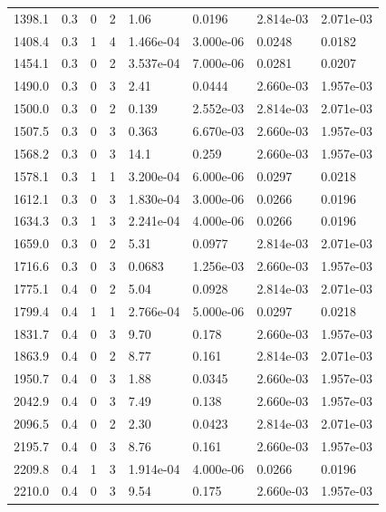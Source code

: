 \documentclass[preview]{standalone}
\begin{document}
{{{\begin{tabular}{L{1.2cm}C{1.2cm} C{0.3cm}C{0.5cm} C{1.4cm}C{1.4cm} C{1.4cm}C{1.4cm}}
  1398.1  &   0.3  & 0     &  2 &  1.06  & 0.0196  & 2.814e-03 &  2.071e-03   \\ 
  1408.4  &   0.3  & 1     &  4 &  1.466e-04  & 3.000e-06  & 0.0248 &  0.0182   \\ 
  1454.1  &   0.3  & 0     &  2 &  3.537e-04  & 7.000e-06  & 0.0281 &  0.0207   \\ 
  1490.0  &   0.3  & 0     &  3 &  2.41  & 0.0444  & 2.660e-03 &  1.957e-03   \\ 
  1500.0  &   0.3  & 0     &  2 &  0.139  & 2.552e-03  & 2.814e-03 &  2.071e-03   \\ 
  1507.5  &   0.3  & 0     &  3 &  0.363  & 6.670e-03  & 2.660e-03 &  1.957e-03   \\ 
  1568.2  &   0.3  & 0     &  3 &  14.1  & 0.259  & 2.660e-03 &  1.957e-03   \\ 
  1578.1  &   0.3  & 1     &  1 &  3.200e-04  & 6.000e-06  & 0.0297 &  0.0218   \\ 
  1612.1  &   0.3  & 0     &  3 &  1.830e-04  & 3.000e-06  & 0.0266 &  0.0196   \\ 
  1634.3  &   0.3  & 1     &  3 &  2.241e-04  & 4.000e-06  & 0.0266 &  0.0196   \\ 
  1659.0  &   0.3  & 0     &  2 &  5.31  & 0.0977  & 2.814e-03 &  2.071e-03   \\ 
  1716.6  &   0.3  & 0     &  3 &  0.0683  & 1.256e-03  & 2.660e-03 &  1.957e-03   \\ 
  1775.1  &   0.4  & 0     &  2 &  5.04  & 0.0928  & 2.814e-03 &  2.071e-03   \\ 
  1799.4  &   0.4  & 1     &  1 &  2.766e-04  & 5.000e-06  & 0.0297 &  0.0218   \\ 
  1831.7  &   0.4  & 0     &  3 &  9.70  & 0.178  & 2.660e-03 &  1.957e-03   \\ 
  1863.9  &   0.4  & 0     &  2 &  8.77  & 0.161  & 2.814e-03 &  2.071e-03   \\ 
  1950.7  &   0.4  & 0     &  3 &  1.88  & 0.0345  & 2.660e-03 &  1.957e-03   \\ 
  2042.9  &   0.4  & 0     &  3 &  7.49  & 0.138  & 2.660e-03 &  1.957e-03   \\ 
  2096.5  &   0.4  & 0     &  2 &  2.30  & 0.0423  & 2.814e-03 &  2.071e-03   \\ 
  2195.7  &   0.4  & 0     &  3 &  8.76  & 0.161  & 2.660e-03 &  1.957e-03   \\ 
  2209.8  &   0.4  & 1     &  3 &  1.914e-04  & 4.000e-06  & 0.0266 &  0.0196   \\ 
  2210.0  &   0.4  & 0     &  3 &  9.54  & 0.175  & 2.660e-03 &  1.957e-03   \\ 

\end{tabular}}}}
\end{document}
